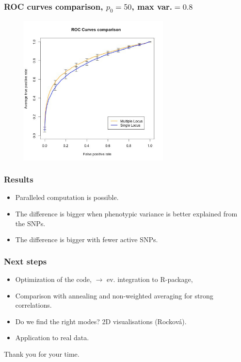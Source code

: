 \documentclass{beamer}
\begin{document}
\begin{frame}
\frametitle{ROC curves comparison, $p_0 = 50$, max var.$=0.8$}
\begin{figure}
\includegraphics[width=3in]{images/ROC_Comp_p0_50_var_0_8.jpeg}
\end{figure}
\end{frame}

\begin{frame}
\frametitle{Results}
\begin{itemize}
\item Paralleled computation is possible.
\item The difference is bigger when phenotypic variance is better explained from the SNPs.
\item The difference is bigger with fewer active SNPs.
\end{itemize}
\end{frame}

\begin{frame}
\frametitle{Next steps}
\begin{itemize}
\item Optimization of the code, $\rightarrow$ ev. integration to R-package,
\item Comparison with annealing and non-weighted averaging for strong correlations.
\item Do we find the right modes? 2D visualisations (Rocková).
\item Application to real data.

\end{itemize}
\end{frame}

\begin{frame}
Thank you for your time.
\end{frame}
\end{document}
